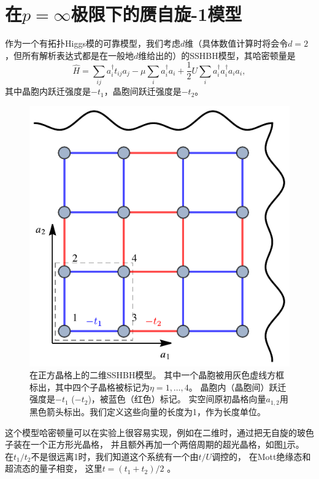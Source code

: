 \section{在$p=\infty$极限下的赝自旋-1模型}

作为一个有拓扑Higgs模的可靠模型，我们考虑$d$维（具体数值计算时将会令$d=2$，但所有解析表达式都是在一般地$d$维给出的）的SSHBH模型，其哈密顿量是
\begin{equation}
  \hat{H} = \sum_{i   j} a_i^{ \dagger} t_{i   j} a_j - \mu \sum_i
  a_i^{ \dagger} a_i + \frac{1}{2}U \sum_i a^{ \dagger}_i a_i^{ \dagger} a_i a_i, \label{h}
\end{equation}
其中晶胞内跃迁强度是$- t_1$，晶胞间跃迁强度是$- t_2$。%
\begin{figure}[t]
\centering
    \includegraphics[width=.8\textwidth]{figures/FigLattice.pdf}
    \caption{在正方晶格上的二维SSHBH模型。
    其中一个晶胞被用灰色虚线方框标出，其中四个子晶格被标记为$\eta=1,\dots,4$。
    晶胞内（晶胞间）跃迁强度是$-t_1$ ($-t_2$)，被蓝色（红色）标记。
    实空间原初晶格向量$a_{1,2}$用黑色箭头标出。我们定义这些向量的长度为1，作为长度单位。}
    \label{lattice}
\end{figure}
这个模型哈密顿量可以在实验上很容易实现，例如在二维时，通过把无自旋的玻色子装在一个正方形光晶格，
并且额外再加一个两倍周期的超光晶格，如图\ref{lattice}示。
在$t_1 / t_2$不是很远离1时，我们知道这个系统有一个由$t / U$调控的，
在Mott绝缘态和超流态的量子相变，
这里$t = (t_1 + t_2)/2$ \cite{Fisher1989}。
